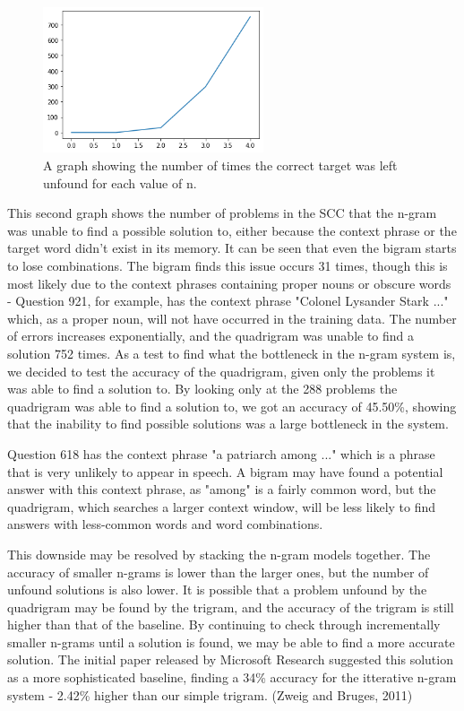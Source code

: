 \documentclass{article}
\begin{document}
\begin{figure}[h]
\includegraphics[width=6.5cm]{graph2.png}
\centering
\caption{A graph showing the number of times the correct target was left unfound for each value of n.}
\end{figure}

This second graph shows the number of problems in the SCC that the n-gram was unable to find a possible solution to, either because the context phrase or the target word didn't exist in its memory. It can be seen that even the bigram starts to lose combinations. The bigram finds this issue occurs 31 times, though this is most likely due to the context phrases containing proper nouns or obscure words - Question 921, for example, has the context phrase "Colonel Lysander Stark ..." which, as a proper noun, will not have occurred in the training data. The number of errors increases exponentially, and the quadrigram was unable to find a solution 752 times. As a test to find what the bottleneck in the n-gram system is, we decided to test the accuracy of the quadrigram, given only the problems it was able to find a solution to. By looking only at the 288 problems the quadrigram was able to find a solution to, we got an accuracy of 45.50\%, showing that the inability to find possible solutions was a large bottleneck in the system.

Question 618 has the context phrase "a patriarch among ..." which is a phrase that is very unlikely to appear in speech. A bigram may have found a potential answer with this context phrase, as "among" is a fairly common word, but the quadrigram, which searches a larger context window, will be less likely to find answers with less-common words and word combinations.

This downside may be resolved by stacking the n-gram models together. The accuracy of smaller n-grams is lower than the larger ones, but the number of unfound solutions is also lower. It is possible that a problem unfound by the quadrigram may be found by the trigram, and the accuracy of the trigram is still higher than that of the baseline. By continuing to check through incrementally smaller n-grams until a solution is found, we may be able to find a more accurate solution. The initial paper released by Microsoft Research suggested this solution as a more sophisticated baseline, finding a 34\% accuracy for the itterative n-gram system - 2.42\% higher than our simple trigram. (Zweig and Bruges, 2011) 
\end{document}
